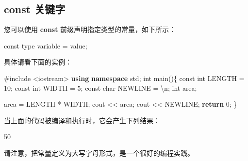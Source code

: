 \documentclass[
]{article}
\newenvironment{Shaded}{}{}
\newcommand{\AttributeTok}[1]{\textcolor[rgb]{0.49,0.56,0.16}{#1}}
\newcommand{\CharTok}[1]{\textcolor[rgb]{0.25,0.44,0.63}{#1}}
\newcommand{\ControlFlowTok}[1]{\textcolor[rgb]{0.00,0.44,0.13}{\textbf{#1}}}
\newcommand{\DataTypeTok}[1]{\textcolor[rgb]{0.56,0.13,0.00}{#1}}
\newcommand{\DecValTok}[1]{\textcolor[rgb]{0.25,0.63,0.44}{#1}}
\newcommand{\ImportTok}[1]{#1}
\newcommand{\KeywordTok}[1]{\textcolor[rgb]{0.00,0.44,0.13}{\textbf{#1}}}
\newcommand{\NormalTok}[1]{#1}
\newcommand{\OperatorTok}[1]{\textcolor[rgb]{0.40,0.40,0.40}{#1}}
\newcommand{\PreprocessorTok}[1]{\textcolor[rgb]{0.74,0.48,0.00}{#1}}
\newcommand{\SpecialCharTok}[1]{\textcolor[rgb]{0.25,0.44,0.63}{#1}}
\begin{document}
\hypertarget{const-ux5173ux952eux5b57}{%
\subsection{const 关键字}\label{const-ux5173ux952eux5b57}}

您可以使用 \textbf{const} 前缀声明指定类型的常量，如下所示：

\begin{Shaded}
\begin{Highlighting}[]
\AttributeTok{const}\NormalTok{ type variable }\OperatorTok{=}\NormalTok{ value}\OperatorTok{;}
\end{Highlighting}
\end{Shaded}

具体请看下面的实例：

\begin{Shaded}
\begin{Highlighting}[]
\PreprocessorTok{\#include }\ImportTok{\textless{}iostream\textgreater{}}
\KeywordTok{using} \KeywordTok{namespace}\NormalTok{ std}\OperatorTok{;}
\DataTypeTok{int}\NormalTok{ main}\OperatorTok{()\{}
   \AttributeTok{const} \DataTypeTok{int}\NormalTok{  LENGTH }\OperatorTok{=} \DecValTok{10}\OperatorTok{;}
   \AttributeTok{const} \DataTypeTok{int}\NormalTok{  WIDTH  }\OperatorTok{=} \DecValTok{5}\OperatorTok{;}
   \AttributeTok{const} \DataTypeTok{char}\NormalTok{ NEWLINE }\OperatorTok{=} \CharTok{\textquotesingle{}}\SpecialCharTok{\textbackslash{}n}\CharTok{\textquotesingle{}}\OperatorTok{;}
   \DataTypeTok{int}\NormalTok{ area}\OperatorTok{;}  
   
\NormalTok{   area }\OperatorTok{=}\NormalTok{ LENGTH }\OperatorTok{*}\NormalTok{ WIDTH}\OperatorTok{;}
\NormalTok{   cout }\OperatorTok{\textless{}\textless{}}\NormalTok{ area}\OperatorTok{;}
\NormalTok{   cout }\OperatorTok{\textless{}\textless{}}\NormalTok{ NEWLINE}\OperatorTok{;}
   \ControlFlowTok{return} \DecValTok{0}\OperatorTok{;}
\OperatorTok{\}}
\end{Highlighting}
\end{Shaded}

当上面的代码被编译和执行时，它会产生下列结果：

\begin{Shaded}
\begin{Highlighting}[]
\DecValTok{50}
\end{Highlighting}
\end{Shaded}

请注意，把常量定义为大写字母形式，是一个很好的编程实践。
\end{document}
